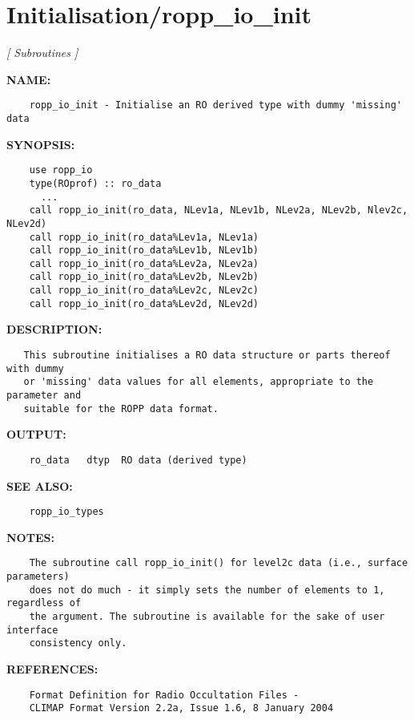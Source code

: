 \section{Initialisation/ropp\_io\_init}
\textsl{[ Subroutines ]}

\label{ch:robo69}
\label{ch:Initialisation_ropp_io_init}
\textbf{NAME:}\hspace{0.08in}\begin{Verbatim}
    ropp_io_init - Initialise an RO derived type with dummy 'missing' data
\end{Verbatim}
\textbf{SYNOPSIS:}\hspace{0.08in}\begin{Verbatim}
    use ropp_io
    type(ROprof) :: ro_data
      ...
    call ropp_io_init(ro_data, NLev1a, NLev1b, NLev2a, NLev2b, Nlev2c, NLev2d)
    call ropp_io_init(ro_data%Lev1a, NLev1a)
    call ropp_io_init(ro_data%Lev1b, NLev1b)
    call ropp_io_init(ro_data%Lev2a, NLev2a)
    call ropp_io_init(ro_data%Lev2b, NLev2b)
    call ropp_io_init(ro_data%Lev2c, NLev2c)
    call ropp_io_init(ro_data%Lev2d, NLev2d)
\end{Verbatim}
\textbf{DESCRIPTION:}\hspace{0.08in}\begin{Verbatim}
   This subroutine initialises a RO data structure or parts thereof with dummy
   or 'missing' data values for all elements, appropriate to the parameter and
   suitable for the ROPP data format.
\end{Verbatim}
\textbf{OUTPUT:}\hspace{0.08in}\begin{Verbatim}
    ro_data   dtyp  RO data (derived type)
\end{Verbatim}
\textbf{SEE ALSO:}\hspace{0.08in}\begin{Verbatim}
    ropp_io_types
\end{Verbatim}
\textbf{NOTES:}\hspace{0.08in}\begin{Verbatim}
    The subroutine call ropp_io_init() for level2c data (i.e., surface parameters)
    does not do much - it simply sets the number of elements to 1, regardless of
    the argument. The subroutine is available for the sake of user interface
    consistency only.
\end{Verbatim}
\textbf{REFERENCES:}\hspace{0.08in}\begin{Verbatim}
    Format Definition for Radio Occultation Files -
    CLIMAP Format Version 2.2a, Issue 1.6, 8 January 2004
\end{Verbatim}
